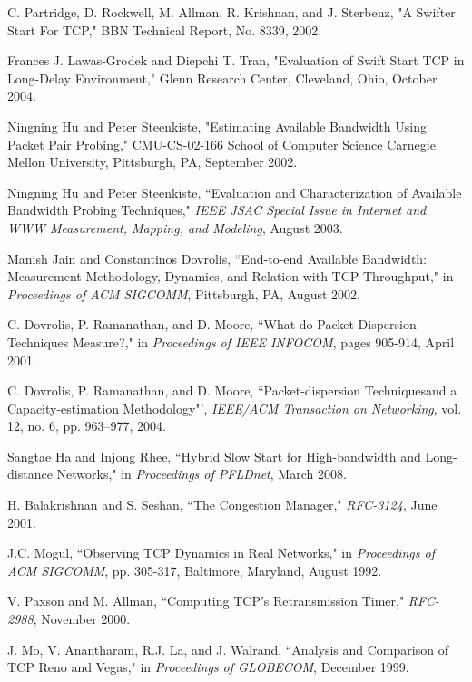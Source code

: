 \documentclass[12pt,onecolumn]{IEEEtran}
\begin{document}
\begin{thebibliography}{99}
C. Partridge, D. Rockwell, M. Allman, R. Krishnan, and J. Sterbenz, "A Swifter Start For TCP," BBN Technical Report, No. 8339, 2002.

Frances J. Lawas-Grodek and Diepchi T. Tran, "Evaluation of Swift Start TCP in Long-Delay Environment," Glenn Research Center, Cleveland, Ohio,
October 2004.

Ningning Hu and Peter Steenkiste, "Estimating Available Bandwidth Using Packet Pair Probing," CMU-CS-02-166 School of Computer Science Carnegie Mellon
University, Pittsburgh, PA, September 2002.

Ningning Hu and Peter Steenkiste, ``Evaluation and Characterization of Available Bandwidth Probing Techniques," \emph{IEEE JSAC Special Issue
in Internet and WWW Measurement, Mapping, and Modeling}, August 2003.

Manish Jain and Constantinos Dovrolis, ``End-to-end Available Bandwidth: Measurement Methodology, Dynamics, and Relation with TCP Throughput," in \emph{Proceedings of ACM SIGCOMM}, Pittsburgh, PA, August 2002.

C. Dovrolis, P. Ramanathan, and D. Moore, ``What do Packet Dispersion Techniques Measure?," in \emph{Proceedings of IEEE INFOCOM}, pages 905-914, April 2001.

C. Dovrolis, P. Ramanathan, and D. Moore, ``Packet-dispersion Techniquesand a
Capacity-estimation Methodology"', \emph{IEEE/ACM Transaction on Networking},
vol. 12, no. 6, pp. 963--977, 2004.


Sangtae Ha and Injong Rhee, ``Hybrid Slow Start for High-bandwidth and Long-distance Networks," in \emph{Proceedings of PFLDnet}, March 2008.

H. Balakrishnan and S. Seshan, ``The Congestion Manager," \emph{RFC-3124}, June 2001.

J.C. Mogul, ``Observing TCP Dynamics in Real Networks," in \emph{Proceedings of ACM SIGCOMM}, pp. 305-317, Baltimore, Maryland, August 1992.


V. Paxson and M. Allman, ``Computing TCP's Retransmission Timer," \emph{RFC-2988}, November 2000.

J. Mo, V. Anantharam, R.J. La, and J. Walrand, ``Analysis and Comparison of TCP Reno and Vegas," in \emph{Proceedings of GLOBECOM}, December 1999.


\end{thebibliography}
\end{document}
